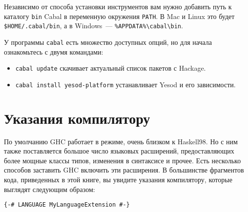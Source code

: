 Независимо от способа установки инструментов вам нужно добавить путь к каталогу \texttt{bin} Cabal в переменную окружения \texttt{PATH}. В Mac и Linux это будет \texttt{\$HOME/.cabal/bin}, а в Windows~--- \texttt{\%APPDATA\%\textbackslash{}cabal\textbackslash{}bin}.

У программы \texttt{cabal} есть множество доступных опций, но для начала ознакомьтесь с двумя командами:

\begin{itemize}
  \item \texttt{cabal update} скачивает актуальный список пакетов с Hackage.
  \item \texttt{cabal install yesod-platform} устанавливает Yesod и его зависимости.
\end{itemize}


\section{Указания компилятору}

По умолчанию GHC работает в режиме, очень близком к Haskell98. Но с ним также поставляется большое число языковых расширений, предоставляющих более мощные классы типов, изменения в синтаксисе и прочее. Есть несколько способов заставить GHC включить эти расширения. В большинстве фрагментов кода, приведенных в этой книге, вы увидите указания компилятору, которые выглядят следующим образом:

\begin{lstlisting}
{-# LANGUAGE MyLanguageExtension #-}
\end{lstlisting}

